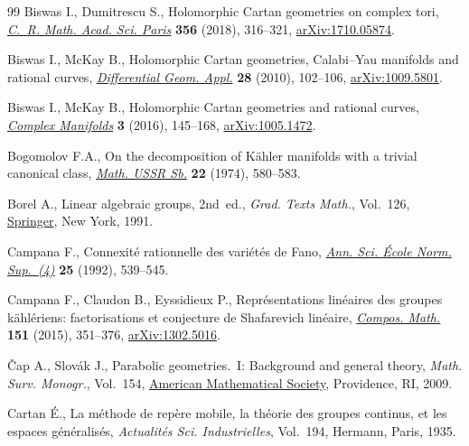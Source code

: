 \documentclass[11pt]{article}
\numberwithin{equation}{section}
\numberwithin{equation}{section}
\begin{document}
\begin{thebibliography}{99}
Biswas I., Dumitrescu S., Holomorphic {C}artan geometries on complex tori,
 \href{https://doi.org/10.1016/j.crma.2018.02.005}{\textit{C.~R. Math. Acad. Sci. Paris}} \textbf{356} (2018), 316--321,
 \href{https://arxiv.org/abs/1710.05874}{arXiv:1710.05874}.

Biswas I., McKay B., Holomorphic {C}artan geometries, {C}alabi--{Y}au manifolds
 and rational curves, \href{https://doi.org/10.1016/j.difgeo.2009.09.003}{\textit{Differential Geom. Appl.}} \textbf{28} (2010),
 102--106, \href{https://arxiv.org/abs/1009.5801}{arXiv:1009.5801}.

Biswas I., McKay B., Holomorphic {C}artan geometries and rational curves,
 \href{https://doi.org/10.1515/coma-2016-0004}{\textit{Complex Manifolds}} \textbf{3} (2016), 145--168, \href{https://arxiv.org/abs/1005.1472}{arXiv:1005.1472}.

Bogomolov F.A., On the decomposition of {K}\"ahler manifolds with a trivial
 canonical class, \href{https://doi.org/10.1070/SM1974v022n04ABEH001706}{\textit{Math. USSR Sb.}} \textbf{22} (1974), 580--583.

Borel A., Linear algebraic groups, 2nd~ed., \textit{Grad. Texts Math.}, Vol.~126, \href{https://doi.org/10.1007/978-1-4612-0941-6}{Springer}, New York, 1991.

Campana F., Connexit\'e rationnelle des vari\'et\'es de {F}ano, \href{https://doi.org/10.24033/asens.1658}{\textit{Ann.
 Sci. \'Ecole Norm. Sup.~(4)}} \textbf{25} (1992), 539--545.

Campana F., Claudon B., Eyssidieux P., Repr\'esentations lin\'eaires des
 groupes k\"ahl\'eriens: factorisations et conjecture de {S}hafarevich
 lin\'eaire, \href{https://doi.org/10.1112/S0010437X14007751}{\textit{Compos. Math.}} \textbf{151} (2015), 351--376,
 \href{https://arxiv.org/abs/1302.5016}{arXiv:1302.5016}.

\v{C}ap A., Slov\'ak J., Parabolic geometries.~{I}: {B}ackground and general
 theory, \textit{Math. Surv. Monogr.}, Vol.~154, \href{https://doi.org/10.1090/surv/154}{American Mathematical
 Society}, Providence, RI, 2009.

Cartan \'E., La m\'ethode de rep\`ere mobile, la th\'eorie des groupes continus,
 et les espaces g\'en\'eralis\'es, \textit{Actualit\'es Sci. Industrielles},
 Vol.~194, Hermann, Paris, 1935.


\end{thebibliography}
\end{document}
